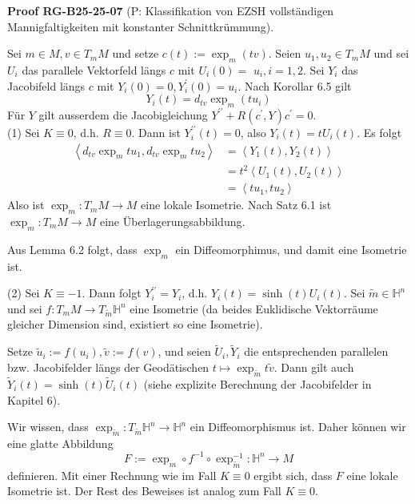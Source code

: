 \documentclass[10pt, letterpaper]{article}
\newcommand{\CustomHeading}[3]{%
  \par\medskip\noindent%
  \textbf{#1 #2} \textnormal{(#3)}.\enskip%
}
\newenvironment{PROOF}[2]{\begin{unitbox}\CustomHeading{Proof}{#1}{#2}}{\end{unitbox}}
\begin{document}
\begin{PROOF}{RG-B25-25-07}{P: Klassifikation von EZSH vollständigen Mannigfaltigkeiten mit konstanter Schnittkrümmung}
Sei $m \in M, v \in T_{m} M$ und setze $c(t):=\exp _{m}(t v)$. Seien $u_{1}, u_{2} \in T_{m} M$ und sei $U_{i}$ das parallele Vektorfeld längs $c$ mit $U_{i}(0)=$ $u_{i}, i=1,2$. Sei $Y_{i}$ das Jacobifeld längs $c$ mit $Y_{i}(0)=0, Y_{i}^{\prime}(0)=u_{i}$. Nach Korollar 6.5 gilt
$$
Y_{i}(t)=d_{t v} \exp _{m}\left(t u_{i}\right)
$$
Für $Y$ gilt ausserdem die Jacobigleichung $Y^{\prime \prime}+R\left(c^{\prime}, Y\right) c^{\prime}=0$.\\
(1) Sei $K \equiv 0$, d.h. $R \equiv 0$. Dann ist $Y_{i}^{\prime \prime}(t)=0$, also $Y_{i}(t)=t U_{i}(t)$. Es folgt
$$
\begin{aligned}
\left\langle d_{t v} \exp _{m} t u_{1}, d_{t v} \exp _{m} t u_{2}\right\rangle & =\left\langle Y_{1}(t), Y_{2}(t)\right\rangle \\
& =t^{2}\left\langle U_{1}(t), U_{2}(t)\right\rangle \\
& =\left\langle t u_{1}, t u_{2}\right\rangle
\end{aligned}
$$
Also ist $\exp _{m}: T_{m} M \rightarrow M$ eine lokale Isometrie. Nach Satz 6.1 ist $\exp _{m}: T_{m} M \rightarrow M$ eine Überlagerungsabbildung.

Aus Lemma 6.2 folgt, dass $\exp _{m}$ ein Diffeomorphimus, und damit eine Isometrie ist.


(2) Sei $K \equiv-1$. Dann folgt $Y_{i}^{\prime \prime}=Y_{i}$, d.h. $Y_{i}(t)=\sinh (t) U_{i}(t)$. Sei $\tilde{m} \in \mathbb{H}^{n}$ und sei $f: T_{m} M \rightarrow T_{\tilde{m}} \mathbb{H}^{n}$ eine Isometrie (da beides Euklidische Vektorräume gleicher Dimension sind, existiert so eine Isometrie).

Setze $\tilde{u}_{i}:=f\left(u_{i}\right), \tilde{v}:=f(v)$, und seien $\tilde{U}_{i}, \tilde{Y}_{i}$ die entsprechenden parallelen bzw. Jacobifelder längs der Geodätischen $t \mapsto \exp _{\tilde{m}} t \tilde{v}$. Dann gilt auch $\tilde{Y}_{i}(t)=\sinh (t) \tilde{U}_{i}(t)$ (siehe explizite Berechnung der Jacobifelder in Kapitel 6).

Wir wissen, dass $\exp _{\tilde{m}}: T_{\tilde{m}} \mathbb{H}^{n} \rightarrow \mathbb{H}^{n}$ ein Diffeomorphismus ist. Daher können wir eine glatte Abbildung
$$
F:=\exp _{m} \circ f^{-1} \circ \exp _{\tilde{m}}^{-1}: \mathbb{H}^{n} \rightarrow M
$$
definieren. Mit einer Rechnung wie im Fall $K \equiv 0$ ergibt sich, dass $F$ eine lokale Isometrie ist. Der Rest des Beweises ist analog zum Fall $K \equiv 0$.



\end{PROOF}
\end{document}
